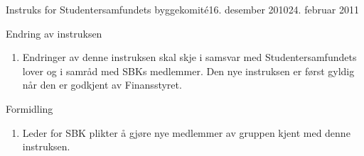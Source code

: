 \begin{instruks}{Instruks for Studentersamfundets byggekomité}{16. desember 2010}{24. februar 2011}
    \begin{instruksledd}{Endring av instruksen}
        \begin{enumerate}
            \item Endringer av denne instruksen skal skje i samsvar med Studentersamfundets lover
                og i samråd med SBKs
                medlemmer. Den nye instruksen er først gyldig når den er godkjent av Finansstyret.
        \end{enumerate}
    \end{instruksledd}

    \begin{instruksledd}{Formidling}
        \begin{enumerate}
            \item Leder for SBK plikter å gjøre nye medlemmer av gruppen kjent med denne
                instruksen.
        \end{enumerate}
    \end{instruksledd}


\end{instruks}


